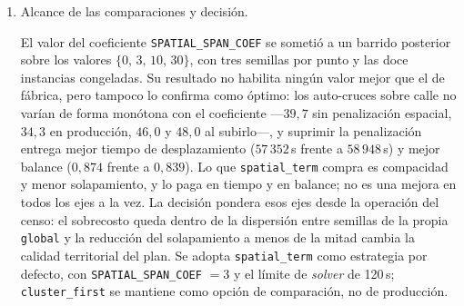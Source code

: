 \begin{enumerate}
La estructura de la grilla es la ya descrita para el compromiso entre balance y costo:
$T_{\max}=2$\,h fuerza un balance $\approx 1{,}0$ y dispara la flota ($23 \rightarrow 36
\rightarrow 49$ conforme crece el tiempo de servicio), mientras que $T_{\max}=3$\,h reduce $k$ en
torno a un 30\,\% con un balance de $\approx 0{,}83$. En la única variante con contraste homogéneo
---la del \textit{head-to-head}--- \texttt{spatial\_term} emplea el mismo número de rutas que
\texttt{global} ($k=25$), lo que indica que el término espacial \textit{no} infla la flota. La
observación operacional relevante es que las variantes de $T_{\max}=2$\,h con tiempo de servicio
alto descartan árboles (uno con servicio de 2\,min, dos con 3\,min, de forma consistente en las
tres semillas): si el censo exige cobertura total debe emplearse
$T_{\max}=3$\,h.\footnote{La fila del \textit{head-to-head}, reejecutada aquí, difiere de la
Tabla~\ref{tab:estrategias} en menos de un $0{,}1$\,\% de desplazamiento por el corte por reloj de
pared del GLS, lo que acota la precisión de estas comparaciones.}

\item Alcance de las comparaciones y decisión.

El valor del coeficiente \texttt{SPATIAL\_SPAN\_COEF} se sometió a un barrido posterior sobre los
valores $\{0,\,3,\,10,\,30\}$, con tres semillas por punto y las doce instancias congeladas. Su
resultado no habilita ningún valor mejor que el de fábrica, pero tampoco lo confirma como óptimo:
los auto-cruces sobre calle no varían de forma monótona con el coeficiente ---$39{,}7$ sin
penalización espacial, $34{,}3$ en producción, $46{,}0$ y $48{,}0$ al subirlo---, y suprimir la
penalización entrega mejor tiempo de desplazamiento ($57\,352$\,s frente a $58\,948$\,s) y mejor
balance ($0{,}874$ frente a $0{,}839$). Lo que \texttt{spatial\_term} compra es compacidad y menor
solapamiento, y lo paga en tiempo y en balance; no es una mejora en todos los ejes a la vez. La
decisión pondera esos ejes desde la operación del censo: el sobrecosto queda dentro de la
dispersión entre semillas de la propia \texttt{global} y la reducción del solapamiento a menos de
la mitad cambia la calidad territorial del plan. Se adopta \texttt{spatial\_term} como estrategia
por defecto, con \texttt{SPATIAL\_SPAN\_COEF} $=3$ y el límite de \textit{solver} de 120\,s;
\texttt{cluster\_first} se mantiene como opción de comparación, no de producción.

\end{enumerate}


